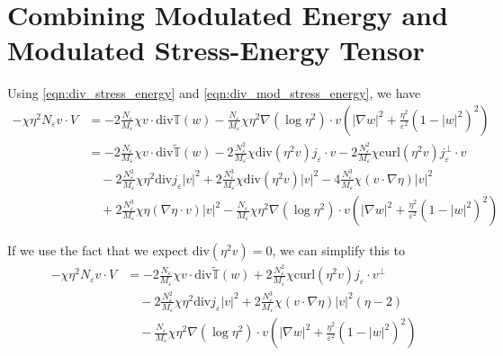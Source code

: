 \documentclass[a4paper]{article}
\newcommand{\curl}{\mathrm{curl}}
\renewcommand{\div}{\mathrm{div}}
\begin{document}
\section{Combining Modulated Energy and Modulated Stress-Energy Tensor}
Using \eqref{eqn:div_stress_energy} and \eqref{eqn:div_mod_stress_energy}, we have
\begin{align}
  - \chi \eta^2 N_\varepsilon v \cdot V &= -2 \frac{N_\varepsilon}{M_\varepsilon} \chi v \cdot \div \mathbb{T}(w) - \frac{N_\varepsilon}{M_\varepsilon}
  \chi \eta^2 \nabla( \log \eta^2 ) \cdot v \left( | \nabla w |^2 + \frac{\eta^2}{\varepsilon^2} (1-|w|^2)^2 \right) \nonumber \\
  &= -2 \frac{N_\varepsilon}{M_\varepsilon} \chi v \cdot \div \tilde{\mathbb{T}}(w) - 2 \frac{N_\varepsilon^2}{M_\varepsilon} \chi \div(\eta^2v) j_\varepsilon
  \cdot v - 2 \frac{N_\varepsilon^2}{M_\varepsilon} \chi \curl(\eta^2 v) j_\varepsilon^\perp \cdot v \nonumber \\
  &\quad - 2\frac{N_\varepsilon^2}{M_\varepsilon} \chi \eta^2 \div j_\varepsilon |v|^2 + 2 \frac{N_\varepsilon^3}{M_\varepsilon} \chi \div (\eta^2 v)
  |v|^2 - 4 \frac{N_\varepsilon^3}{M_\varepsilon} \chi (v \cdot \nabla \eta) |v|^2 \nonumber \\
  &\quad + 2 \frac{N_\varepsilon^3}{M_\varepsilon} \chi \eta ( \nabla \eta \cdot v ) |v|^2 - \frac{N_\varepsilon}{M_\varepsilon}
  \chi \eta^2 \nabla( \log \eta^2 ) \cdot v \left( | \nabla w |^2 + \frac{\eta^2}{\varepsilon^2} (1-|w|^2)^2 \right)
  \label{eqn:substitution1}
\end{align}

If we use the fact that we expect $\div ( \eta^2 v ) = 0$, we can simplify this to
\begin{align}
  - \chi \eta^2 N_\varepsilon v \cdot V &= -2 \frac{N_\varepsilon}{M_\varepsilon} \chi v \cdot \div \tilde{\mathbb{T}}(w) + 2
  \frac{N_\varepsilon^2}{M_\varepsilon} \chi \curl(\eta^2 v) j_\varepsilon \cdot v^\perp \nonumber \\
  &\quad - 2\frac{N_\varepsilon^2}{M_\varepsilon} \chi \eta^2 \div j_\varepsilon |v|^2 + 2 \frac{N_\varepsilon^3}{M_\varepsilon} \chi (v \cdot \nabla
  \eta) |v|^2 (\eta - 2) \nonumber \\
  &\quad - \frac{N_\varepsilon}{M_\varepsilon}
  \chi \eta^2 \nabla( \log \eta^2 ) \cdot v \left( | \nabla w |^2 + \frac{\eta^2}{\varepsilon^2} (1-|w|^2)^2 \right)
  \label{eqn:substitution2}
\end{align}
\end{document}
